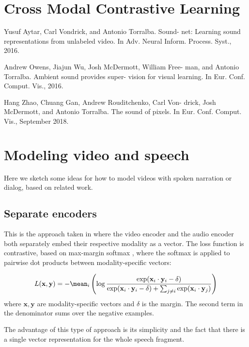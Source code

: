 

\appendix

\section{Cross Modal Contrastive Learning}

Yusuf Aytar, Carl Vondrick, and Antonio Torralba. Sound-
net: Learning sound representations from unlabeled video.
In Adv. Neural Inform. Process. Syst., 2016. 

Andrew Owens, Jiajun Wu, Josh McDermott, William Free-
man, and Antonio Torralba. Ambient sound provides super-
vision for visual learning. In Eur. Conf. Comput. Vis., 2016.

Hang Zhao, Chuang Gan, Andrew Rouditchenko, Carl Von-
drick, Josh McDermott, and Antonio Torralba. The sound of
pixels. In Eur. Conf. Comput. Vis., September 2018.


\section{Modeling video and speech}
Here we sketch some ideas for how to model videos with spoken
narration or dialog, based on related work.

\subsection{Separate encoders}
This is the approach taken in \citet{rouditchenko2020avlnet} where the
video encoder and the audio encoder both separately embed their
respective modality as a vector. The loss function is contrastive,
based on max-margin softmax \citep{ilharco-etal-2019-large}, where the
softmax is applied to pairwise dot products between modality-specific
vectors:

\begin{equation}
  \label{eq:mms}
  L(\mathbf{x}, \mathbf{y}) = - \mean_i \left(
    \log \frac{\exp(\mathbf{x}_i\cdot \mathbf{y}_i-\delta)}
    { \exp(\mathbf{x}_i\cdot \mathbf{y}_i-\delta) + \sum_{j\neq i}
      \exp(\mathbf{x}_i \cdot \mathbf{y}_j)  }
  \right)
\end{equation}
where $\mathbf{x, y}$ are modality-specific vectors and $\delta$ is the
margin. The second term in the denominator sums over the negative
examples.

The advantage of this type of approach is its simplicity and the fact
that there is a single vector representation for the whole speech
fragment.

